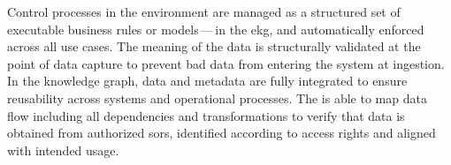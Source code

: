 %
%
Control processes in the  environment are managed as a structured set of executable business rules
or models\,---\,in the \gls{ekg}, and automatically enforced across all use cases.
The meaning of the data is structurally validated at the point of data capture to prevent bad data from
entering the system at ingestion.
In the knowledge graph, data and metadata are fully integrated to ensure reusability across systems
and operational processes.
The  is able to map data flow including all dependencies and transformations to verify that
data is obtained from authorized \glspl{sor}, identified according to access rights and
aligned with intended usage.
